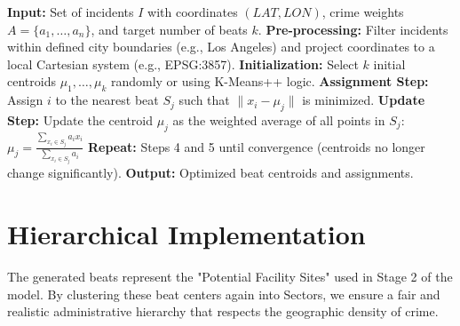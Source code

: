 \documentclass[12pt]{article}
\begin{document}
\begin{algorithm}
\caption{Weighted Beat Generation Algorithm}
\begin{algorithmic}[1]
\State \textbf{Input:} Set of incidents $I$ with coordinates $(LAT, LON)$, crime weights $A = \{a_1, \dots, a_n\}$, and target number of beats $k$.
\State \textbf{Pre-processing:} Filter incidents within defined city boundaries (e.g., Los Angeles) and project coordinates to a local Cartesian system (e.g., EPSG:3857).
\State \textbf{Initialization:} Select $k$ initial centroids $\mu_1, \dots, \mu_k$ randomly or using K-Means++ logic.
\State \textbf{Assignment Step:}
        \State Assign $i$ to the nearest beat $S_j$ such that $\| x_i - \mu_j \|$ is minimized.
    \EndFor
\State \textbf{Update Step:}
        \State Update the centroid $\mu_j$ as the weighted average of all points in $S_j$:
        \State $\mu_j = \frac{\sum_{x_i \in S_j} a_i x_i}{\sum_{x_i \in S_j} a_i}$
    \EndFor
\State \textbf{Repeat:} Steps 4 and 5 until convergence (centroids no longer change significantly).
\State \textbf{Output:} Optimized beat centroids and assignments.
\end{algorithmic}
\end{algorithm}

\section{Hierarchical Implementation}
The generated beats represent the "Potential Facility Sites" used in Stage 2 of the model. By clustering these beat centers again into Sectors, we ensure a fair and realistic administrative hierarchy that respects the geographic density of crime.
\end{document}
